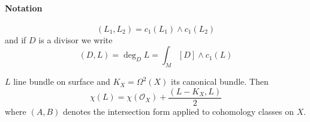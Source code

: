 \paragraph{Notation}
\[(L_1,L_2)=c_1(L_1)\wedge c_1(L_2)\]
and if $D$ is a divisor we write
\[(D,L)=\operatorname{deg}_DL=\int_{M}[D]\wedge c_1(L)\]

\begin{thm}\leavevmode
	$L$ line bundle on surface and $K_{X}=\Omega^{2}(X)$ its canonical bundle. Then
	\begin{equation*}\label{eq:rrh}
\chi(L)=\chi(\mathcal{O}_{X})+\frac{(L-K_X,L)}{2}
	\end{equation*}
	where $(A,B)$ denotes the intersection form applied to cohomology classes on $X$.
\end{thm}

